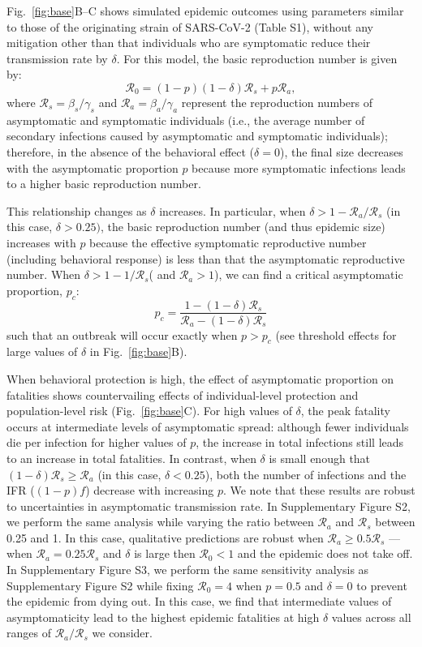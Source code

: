\documentclass[12pt]{article}
\newcommand{\fref}[1]{Fig.~\ref{fig:#1}}
\newcommand{\RR}{\ensuremath{{\mathcal R}}\xspace}
\begin{document}
\fref{base}B--C shows simulated epidemic outcomes using parameters similar to those of the originating strain of SARS-CoV-2 (Table S1), without any mitigation other than that individuals who are symptomatic reduce their transmission rate by $\delta$. 
For this model, the basic reproduction number is given by:
\begin{equation}
\RR_0 = (1-p) (1-\delta) \RR_s + p \RR_a,
\end{equation}
where $\RR_s = \beta_s/\gamma_s$ and $\RR_a = \beta_a/\gamma_a$ represent the reproduction numbers of asymptomatic and symptomatic individuals (i.e., the average number of secondary infections caused by asymptomatic and symptomatic individuals);
therefore, in the absence of the behavioral effect ($\delta=0$), the final size decreases with the asymptomatic proportion $p$ because more symptomatic infections leads to a higher basic reproduction number.

This relationship changes as $\delta$ increases.
In particular, when $\delta > 1-\RR_a/\RR_s$ (in this case, $\delta > 0.25)$, the basic reproduction number (and thus epidemic size) increases with $p$ because the effective symptomatic reproductive number (including behavioral response) is less than that the asymptomatic reproductive number.
When $\delta > 1-1/\RR_s$( and $\RR_a>1$), we can find a critical asymptomatic proportion, $p_c$:
\begin{equation}
    p_c = \frac{1 - (1-\delta) \RR_s}{\RR_a - (1-\delta) \RR_s}
\end{equation}
such that an outbreak will occur exactly when $p>p_c$ (see threshold effects for large values of $\delta$ in \fref{base}B).

When behavioral protection is high, the effect of asymptomatic proportion on fatalities shows countervailing effects of individual-level protection and population-level risk (\fref{base}C).
For high values of $\delta$, the peak fatality occurs at intermediate levels of asymptomatic spread:
although fewer individuals die per infection for higher values of $p$, the increase in total infections still leads to an increase in total fatalities.
In contrast, when $\delta$ is small enough that $(1-\delta) \RR_s \geq \RR_a$ (in this case, $\delta < 0.25$), both the number of infections and the IFR ($(1-p)f$) decrease with increasing $p$.
We note that these results are robust to uncertainties in asymptomatic transmission rate.
In Supplementary Figure S2, we perform the same analysis while varying the ratio between $\RR_a$ and $\RR_s$ between 0.25 and 1.
In this case, qualitative predictions are robust when $\RR_a \geq 0.5 \RR_s$
--- when $\RR_a = 0.25 \RR_s$ and $\delta$ is large then $\RR_0 < 1$ and the epidemic does not take off.
In Supplementary Figure S3, we perform the same sensitivity analysis as Supplementary Figure S2 while fixing $\RR_0 = 4$ when $p=0.5$ and $\delta=0$ to prevent the epidemic from dying out. In this case, we find that intermediate values of asymptomaticity lead to the highest epidemic fatalities at high $\delta$ values across all ranges of $\RR_a/\RR_s$ we consider.
\end{document}
